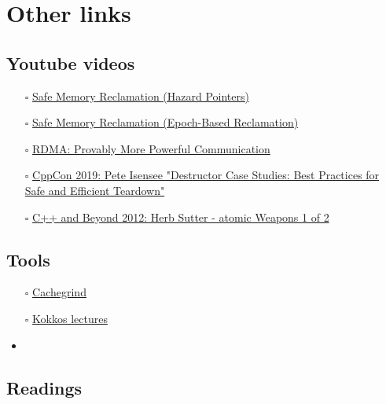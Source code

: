 \documentclass[openany, a4paper]{book}
\theoremstyle{break}
\theoremstyle{example}
\theoremstyle{note}
\theoremstyle{break}
\theoremstyle{exercise}
\begin{document}
\chapter{Other links}
\label{sec:orgc6ddb3b}

\section{Youtube videos}
\label{sec:org0f5e442}

\begin{itemize}
\item[{$\square$}] \href{https://www.youtube.com/watch?v=drXrIVfBKaQ}{Safe Memory Reclamation (Hazard Pointers)}
\item[{$\square$}] \href{https://www.youtube.com/watch?v=cYDMq5FOiw4}{Safe Memory Reclamation (Epoch-Based Reclamation)}
\item[{$\square$}] \href{https://www.microsoft.com/en-us/research/video/rdma-provably-more-powerful-communication/}{RDMA: Provably More Powerful Communication}
\item[{$\square$}] \href{https://www.youtube.com/watch?v=XvWyLAW\_U0Q}{CppCon 2019: Pete Isensee "Destructor Case Studies: Best Practices for
Safe and Efficient Teardown"}
\item[{$\square$}] \href{https://www.youtube.com/watch?app=desktop\&v=A8eCGOqgvH4}{C++ and Beyond 2012: Herb Sutter - atomic Weapons 1 of 2}
\end{itemize}


\section{Tools}
\label{sec:org2cbdc7e}

\begin{itemize}
\item[{$\square$}] \href{https://valgrind.org/docs/manual/cg-manual.html}{Cachegrind}
\item[{$\square$}] \href{https://github.com/kokkos/kokkos-tutorials/wiki/Kokkos-Lecture-Series}{Kokkos lectures}
\item
\end{itemize}


\section{Readings}
\label{sec:orgd337b01}
\end{document}
